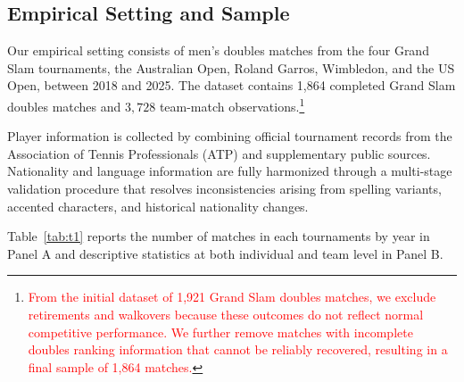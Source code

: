 \documentclass[10pt]{article}
\begin{document}
\subsection{Empirical Setting and Sample}
Our empirical setting consists of men's doubles matches from the four Grand Slam tournaments, the Australian Open, Roland Garros, Wimbledon, and the US Open, between 2018 and 2025. The dataset contains 1,864 completed Grand Slam doubles matches and $3{,}728$ team-match observations.\footnote{\textcolor{red}{From the initial dataset of 1,921 Grand Slam doubles matches, we exclude retirements and walkovers because these outcomes do not reflect normal competitive performance. We further remove matches with incomplete doubles ranking information that cannot be reliably recovered, resulting in a final sample of 1,864 matches.}}

Player information is collected by combining official tournament records from the Association of Tennis Professionals (ATP)  and supplementary public sources. Nationality and language information are fully harmonized through a multi-stage validation procedure that resolves inconsistencies arising from spelling variants, accented characters, and historical nationality changes. %

Table~\ref{tab:t1} reports the number of matches in each tournaments by year in Panel A and descriptive statistics at both individual and team level in Panel B. 
\end{document}
